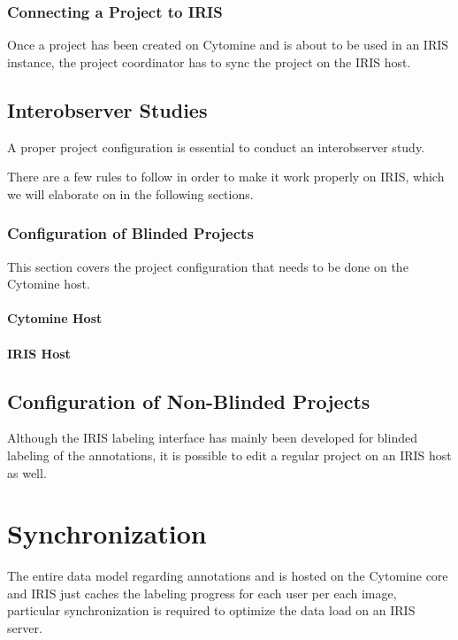 \subsection{Connecting a Project to IRIS}
Once a project has been created on Cytomine and is about to be used in an IRIS instance, the project coordinator has to sync the project on the IRIS host. 


 

\section{Interobserver Studies}
A proper project configuration is essential to conduct an interobserver study. 

There are a few rules to follow in order to make it work properly on IRIS, which we will elaborate on in the following sections. 

\subsection{Configuration of Blinded Projects}
This section covers the project configuration that needs to be done on the Cytomine host. 

\subsubsection{Cytomine Host}

\subsubsection{IRIS Host}


\section{Configuration of Non-Blinded Projects}
Although the IRIS labeling interface has mainly been developed for blinded labeling of the annotations, it is possible to edit a regular project on an IRIS host as well. 




\chapter{Synchronization}
The entire data model regarding annotations and is hosted on the Cytomine core and IRIS just caches the labeling progress for each user per each image, particular synchronization is required to optimize the data load on an IRIS server. 

